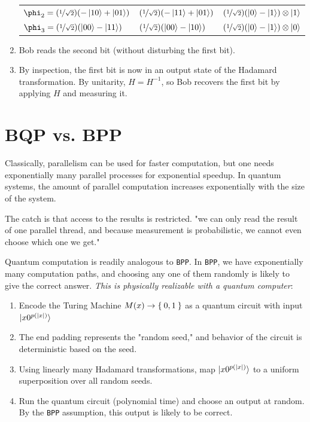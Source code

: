 \documentclass{article}
\begin{document}
\begin{enumerate}
\begin{tabular}{l|l|l}
          $\phi_2 = (\nicefrac{1}{\sqrt{2}})(-\ket{10} + \ket{01})$ & $(\nicefrac{1}{\sqrt{2}})(-\ket{11} + \ket{01})$ & $(\nicefrac{1}{\sqrt{2}})(\ket{0} - \ket{1})\otimes \ket{1}$  \\
          
          $\phi_3 = (\nicefrac{1}{\sqrt{2}})(\ket{00} - \ket{11})$ & $(\nicefrac{1}{\sqrt{2}})(\ket{00} - \ket{10})$ & $(\nicefrac{1}{\sqrt{2}})(\ket{0} - \ket{1})\otimes \ket{0}$  
    \end{tabular}
    
    \item Bob reads the second bit (without disturbing the first bit). 
    \item By inspection, the first bit is now in an output state of the Hadamard transformation. By unitarity, $H = H^{-1}$, so Bob recovers the first bit by applying $H$ and measuring it.
\end{enumerate}
\section{BQP vs. BPP}
Classically, parallelism can be used for faster computation, but one needs exponentially many parallel processes for exponential speedup. In quantum systems, the amount of parallel computation increases exponentially with the size of the system. 

The catch is that access to the results is restricted. "we can only read the result of one parallel thread, and because measurement is probabilistic, we cannot even choose which one we get."

Quantum computation is readily analogous to \texttt{BPP}. In \texttt{BPP}, we have exponentially many computation paths, and choosing any one of them randomly is likely to give the correct answer. \textit{This is physically realizable with a quantum computer}: 
\begin{enumerate}
    \item Encode the Turing Machine $M(x) \to \Set{0, 1}$ as a quantum circuit with input $\ket{x0^{p(|x|)}}$
    \item The end padding represents the "random seed," and behavior of the circuit is deterministic based on the seed.
    \item Using linearly many Hadamard transformations, map $\ket{x0^{p(|x|)}}$ to a uniform superposition over all random seeds.
    \item Run the quantum circuit (polynomial time) and choose an output at random. By the \texttt{BPP} assumption, this output is likely to be correct.
\end{enumerate}
\end{document}
